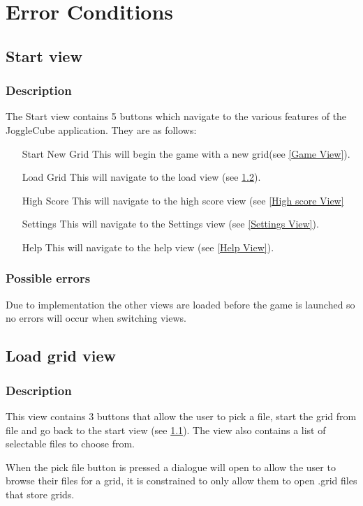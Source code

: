 \documentclass{project}
\begin{document}
\section{Error Conditions}

\subsection{Start view} \label{Start View}
\subsubsection{Description}
The Start view contains 5 buttons which navigate to the various features of the JoggleCube application. They are as follows:
\begin{itemize}
\item[Start New Grid] This will begin the game with a new grid(see \ref{Game View}).
\item[Load Grid] This will navigate to the load view (see \ref{Load View}).
\item[High Score] This will navigate to the high score view (see \ref{High score View}
\item[Settings] This will navigate to the Settings view (see \ref{Settings View}).
\item[Help] This will navigate to the help view (see \ref{Help View}).
\end{itemize} 
\subsubsection{Possible errors}
Due to implementation the other views are loaded before the game is launched so no errors will occur when switching views.

\subsection{Load grid view} \label{Load View}
\subsubsection{Description}
This view contains 3 buttons that allow the user to pick a file, start the grid from file and go back to the start view (see \ref{Start View}). The view also contains a list of selectable files to choose from.

When the pick file button is pressed a dialogue will open to allow the user to browse their files for a grid, it is constrained to only allow them to open .grid files that store grids.
\end{document}
